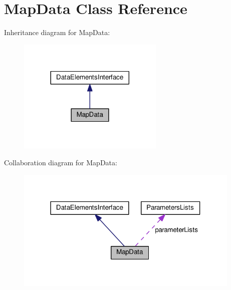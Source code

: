 \hypertarget{class_map_data}{}\section{Map\+Data Class Reference}
\label{class_map_data}


Inheritance diagram for Map\+Data\+:
\nopagebreak
\begin{figure}[H]
\begin{center}
\leavevmode
\includegraphics[width=197pt]{class_map_data__inherit__graph}
\end{center}
\end{figure}


Collaboration diagram for Map\+Data\+:
\nopagebreak
\begin{figure}[H]
\begin{center}
\leavevmode
\includegraphics[width=304pt]{class_map_data__coll__graph}
\end{center}
\end{figure}

